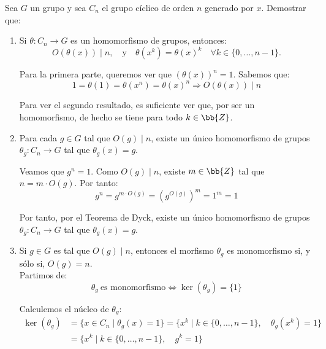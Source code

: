 \begin{ejercicio}\label{ej:3.17}
    Sea $G$ un grupo y sea $C_n$ el grupo cíclico de orden $n$ generado por $x$. Demostrar que:
    \begin{enumerate}
        \item Si $\theta : C_n \to G$ es un homomorfismo de grupos, entonces:
        \begin{equation*}
            O(\theta(x))\mid n, \quad \text{y} \quad \theta(x^k) = \theta(x)^k \quad \forall k \in \{0, \ldots, n - 1\}.
        \end{equation*}

        Para la primera parte, queremos ver que $(\theta(x))^n=1$. Sabemos que:
        \begin{equation*}
            1 = \theta(1) = \theta(x^n) = \theta(x)^n\Longrightarrow
            O(\theta(x))\mid n
        \end{equation*}

        Para ver el segundo resultado, es suficiente ver que, por ser un homomorfismo, de hecho se tiene para todo $k\in \bb{Z}$. 

        \item Para cada $g \in G$ tal que $O(g) \mid n$, existe un único homomorfismo de grupos $\theta_g : C_n \to G$ tal que $\theta_g(x) = g$.
        
        Veamos que $g^n=1$. Como $O(g)\mid n$, existe $m\in \bb{Z}$ tal que $n=m\cdot O(g)$. Por tanto:
        \begin{equation*}
            g^n = g^{m\cdot O(g)} = (g^{O(g)})^m = 1^m = 1
        \end{equation*}

        Por tanto, por el Teorema de Dyck, existe un único homomorfismo de grupos $\theta_g : C_n \to G$ tal que $\theta_g(x) = g$.
        
        \item Si $g \in G$ es tal que $O(g) \mid n$, entonces el morfismo $\theta_g$ es monomorfismo si, y sólo si, $O(g) = n$.\\
        
        Partimos de:
        \begin{equation*}
            \theta_g\ \text{es monomorfismo} \iff \ker(\theta_g) = \{1\}
        \end{equation*}

        Calculemos el núcleo de $\theta_g$:
        \begin{align*}
            \ker(\theta_g) &= \{x\in C_n\mid \theta_g(x)=1\}
            = \{x^k\mid k\in \{0,\ldots,n-1\},\quad \theta_g(x^k)=1\}\\
            &= \{x^k\mid k\in \{0,\ldots,n-1\},\quad g^k=1\}
        \end{align*}


\end{enumerate}
\end{ejercicio}
